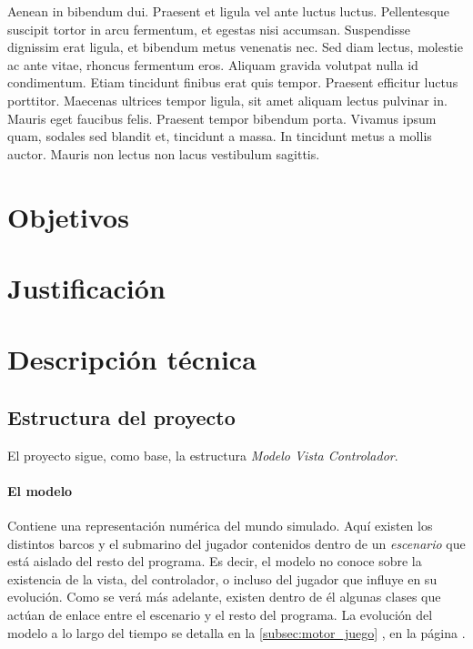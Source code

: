 \documentclass[a4paper,
	11pt,
	parskip=full,
	bibliography=totoc,
	twoside
	]{scrartcl}
\let\oldsection\section
\def\section{\cleardoubleoddpage\oldsection}
\begin{document}
	Aenean in bibendum dui. Praesent et ligula vel ante luctus luctus. Pellentesque suscipit tortor in arcu fermentum, et egestas nisi accumsan. Suspendisse dignissim erat ligula, et bibendum metus venenatis nec. Sed diam lectus, molestie ac ante vitae, rhoncus fermentum eros. Aliquam gravida volutpat nulla id condimentum. Etiam tincidunt finibus erat quis tempor. Praesent efficitur luctus porttitor. Maecenas ultrices tempor ligula, sit amet aliquam lectus pulvinar in. Mauris eget faucibus felis. Praesent tempor bibendum porta. Vivamus ipsum quam, sodales sed blandit et, tincidunt a massa. In tincidunt metus a mollis auctor. Mauris non lectus non lacus vestibulum sagittis. 

\section{Objetivos}
\label{sec:objetivos}

\section{Justificación}
\label{sec:justificacion}

\section{Descripción técnica}
\label{sec:desc_tecnica}
	\subsection{Estructura del proyecto}
	\label{subsec:estructura}
		El proyecto sigue, como base, la estructura \textit{Modelo Vista Controlador}.
		
		\paragraph{El modelo}
			Contiene una representación numérica del mundo simulado. Aquí existen los distintos barcos y el submarino del jugador contenidos dentro de un \textit{escenario} que está aislado del resto del programa. Es decir, el modelo no conoce sobre la existencia de la vista, del controlador, o incluso del jugador que influye en su evolución. Como se verá más adelante, existen dentro de él algunas clases que actúan de enlace entre el escenario y el resto del programa. La evolución del modelo a lo largo del tiempo se detalla en la \autoref{subsec:motor_juego} , en la página \pageref{subsec:motor_juego}.
					
\end{document}
